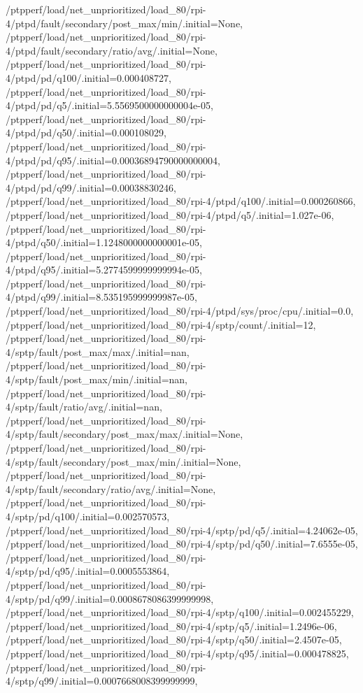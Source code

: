 {    /ptpperf/load/net_unprioritized/load_80/rpi-4/ptpd/fault/secondary/post_max/min/.initial=None,
    /ptpperf/load/net_unprioritized/load_80/rpi-4/ptpd/fault/secondary/ratio/avg/.initial=None,
    /ptpperf/load/net_unprioritized/load_80/rpi-4/ptpd/pd/q100/.initial=0.000408727,
    /ptpperf/load/net_unprioritized/load_80/rpi-4/ptpd/pd/q5/.initial=5.5569500000000004e-05,
    /ptpperf/load/net_unprioritized/load_80/rpi-4/ptpd/pd/q50/.initial=0.000108029,
    /ptpperf/load/net_unprioritized/load_80/rpi-4/ptpd/pd/q95/.initial=0.00036894790000000004,
    /ptpperf/load/net_unprioritized/load_80/rpi-4/ptpd/pd/q99/.initial=0.00038830246,
    /ptpperf/load/net_unprioritized/load_80/rpi-4/ptpd/q100/.initial=0.000260866,
    /ptpperf/load/net_unprioritized/load_80/rpi-4/ptpd/q5/.initial=1.027e-06,
    /ptpperf/load/net_unprioritized/load_80/rpi-4/ptpd/q50/.initial=1.1248000000000001e-05,
    /ptpperf/load/net_unprioritized/load_80/rpi-4/ptpd/q95/.initial=5.2774599999999994e-05,
    /ptpperf/load/net_unprioritized/load_80/rpi-4/ptpd/q99/.initial=8.535195999999987e-05,
    /ptpperf/load/net_unprioritized/load_80/rpi-4/ptpd/sys/proc/cpu/.initial=0.0,
    /ptpperf/load/net_unprioritized/load_80/rpi-4/sptp/count/.initial=12,
    /ptpperf/load/net_unprioritized/load_80/rpi-4/sptp/fault/post_max/max/.initial=nan,
    /ptpperf/load/net_unprioritized/load_80/rpi-4/sptp/fault/post_max/min/.initial=nan,
    /ptpperf/load/net_unprioritized/load_80/rpi-4/sptp/fault/ratio/avg/.initial=nan,
    /ptpperf/load/net_unprioritized/load_80/rpi-4/sptp/fault/secondary/post_max/max/.initial=None,
    /ptpperf/load/net_unprioritized/load_80/rpi-4/sptp/fault/secondary/post_max/min/.initial=None,
    /ptpperf/load/net_unprioritized/load_80/rpi-4/sptp/fault/secondary/ratio/avg/.initial=None,
    /ptpperf/load/net_unprioritized/load_80/rpi-4/sptp/pd/q100/.initial=0.002570573,
    /ptpperf/load/net_unprioritized/load_80/rpi-4/sptp/pd/q5/.initial=4.24062e-05,
    /ptpperf/load/net_unprioritized/load_80/rpi-4/sptp/pd/q50/.initial=7.6555e-05,
    /ptpperf/load/net_unprioritized/load_80/rpi-4/sptp/pd/q95/.initial=0.0005553864,
    /ptpperf/load/net_unprioritized/load_80/rpi-4/sptp/pd/q99/.initial=0.0008678086399999998,
    /ptpperf/load/net_unprioritized/load_80/rpi-4/sptp/q100/.initial=0.002455229,
    /ptpperf/load/net_unprioritized/load_80/rpi-4/sptp/q5/.initial=1.2496e-06,
    /ptpperf/load/net_unprioritized/load_80/rpi-4/sptp/q50/.initial=2.4507e-05,
    /ptpperf/load/net_unprioritized/load_80/rpi-4/sptp/q95/.initial=0.000478825,
    /ptpperf/load/net_unprioritized/load_80/rpi-4/sptp/q99/.initial=0.0007668008399999999,
}
